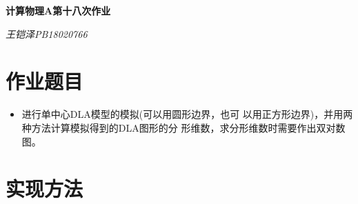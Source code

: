 \documentclass[UTF8]{ctexart}
\begin{document}
	\centering\textbf{\LARGE{计算物理A第十八次作业}}
	
	
	\textit{王铠泽\qquad PB18020766}
	
		
	\section{作业题目}
	
	\begin{itemize}
		\item 进行单中心DLA模型的模拟(可以用圆形边界，也可
		以用正方形边界)，并用两种方法计算模拟得到的DLA图形的分
		形维数，求分形维数时需要作出双对数图。
	\end{itemize}
	
	\section{实现方法}
	
\end{document}
